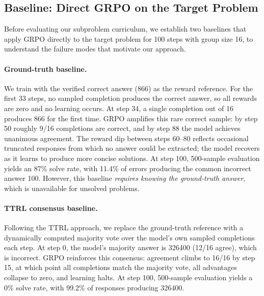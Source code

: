 \documentclass{article}
\begin{document}
\subsection{Baseline: Direct GRPO on the Target Problem}
\label{sec:baselines}

Before evaluating our subproblem curriculum, we establish two baselines that apply GRPO directly to the target problem for 100 steps with group size 16, to understand the failure modes that motivate our approach.

\paragraph{Ground-truth baseline.} We train with the verified correct answer (866) as the reward reference. For the first 33 steps, no sampled completion produces the correct answer, so all rewards are zero and no learning occurs. At step 34, a single completion out of 16 produces 866 for the first time. GRPO amplifies this rare correct sample: by step 50 roughly 9/16 completions are correct, and by step 88 the model achieves unanimous agreement. The reward dip between steps 60--80 reflects occasional truncated responses from which no answer could be extracted; the model recovers as it learns to produce more concise solutions. At step 100, 500-sample evaluation yields an 87\% solve rate, with 11.4\% of errors producing the common incorrect answer 100. However, this baseline \textit{requires knowing the ground-truth answer}, which is unavailable for unsolved problems.

\paragraph{TTRL consensus baseline.} Following the TTRL \cite{ttrl} approach, we replace the ground-truth reference with a dynamically computed majority vote over the model's own sampled completions each step. At step 0, the model's majority answer is 326400 (12/16 agree), which is incorrect. GRPO reinforces this consensus: agreement climbs to 16/16 by step 15, at which point all completions match the majority vote, all advantages collapse to zero, and learning halts. At step 100, 500-sample evaluation yields a 0\% solve rate, with 99.2\% of responses producing 326400.
\end{document}
